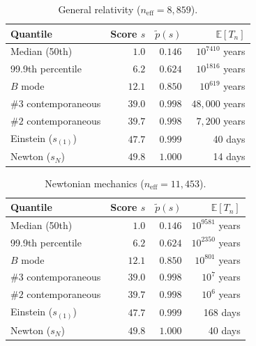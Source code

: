\documentclass{article}
\begin{document}
\begin{table}[ht]
  \centering
  \caption{General relativity ($n_{\mathrm{eff}} = 8{,}859$).}
  \label{tab:gr-full}
  \medskip
  \begin{tabular}{l r r r}
    \hline
    Quantile & Score $s$ & $\widetilde{p}(s)$ &
    $\mathbb{E}[T_n]$ \\
    \hline
    Median (50th)              &  $1.0$  & $0.146$ & $10^{7410}$ years \\
    99.9th percentile          &  $6.2$  & $0.624$ & $10^{1816}$ years \\
    $B$ mode                   & $12.1$  & $0.850$ & $10^{619}$ years \\
    $\#3$ contemporaneous      & $39.0$  & $0.998$ & $48{,}000$ years \\
    $\#2$ contemporaneous      & $39.7$  & $0.998$ & $7{,}200$ years \\
    Einstein ($s_{(1)}$)       & $47.7$  & $0.999$ & 40 days \\
    Newton ($s_N$)             & $49.8$  & $1.000$ & 14 days \\
    \hline
  \end{tabular}
\end{table}

\begin{table}[ht]
  \centering
  \caption{Newtonian mechanics ($n_{\mathrm{eff}} = 11{,}453$).}
  \label{tab:newton-full}
  \medskip
  \begin{tabular}{l r r r}
    \hline
    Quantile & Score $s$ & $\widetilde{p}(s)$ &
    $\mathbb{E}[T_n]$ \\
    \hline
    Median (50th)              &  $1.0$  & $0.146$ & $10^{9581}$ years \\
    99.9th percentile          &  $6.2$  & $0.624$ & $10^{2350}$ years \\
    $B$ mode                   & $12.1$  & $0.850$ & $10^{801}$ years \\
    $\#3$ contemporaneous      & $39.0$  & $0.998$ & $10^{7}$ years \\
    $\#2$ contemporaneous      & $39.7$  & $0.998$ & $10^{6}$ years \\
    Einstein ($s_{(1)}$)       & $47.7$  & $0.999$ & 168 days \\
    Newton ($s_N$)             & $49.8$  & $1.000$ & 40 days \\
    \hline
  \end{tabular}
\end{table}
\end{document}
